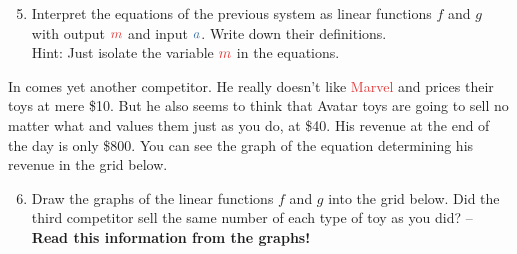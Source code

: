 \documentclass[a4paper,12pt]{article}
\newcommand{\tmar}{\textcolor[HTML]{e23636}}
\newcommand{\tav}{\textcolor[HTML]{2e67a0}}
\begin{document}
\newpage

\begin{enumerate}[label=(\alph*),topsep=0pt]
 \setcounter{enumi}{4}
 \item Interpret the equations of the previous system as linear functions $f$
  and $g$ with output $\tmar{m}$ and input $\tav{a}$. Write down their
  definitions.\\
  Hint: Just isolate the variable $\tmar{m}$ in the equations.
\end{enumerate}

\newpage

In comes yet another competitor. He really doesn't like \tmar{Marvel} and prices
their toys at mere \$10. But he also seems to think that \tav{Avatar} toys are
going to sell no matter what and values them just as you do, at \$40. His
revenue at the end of the day is only \$800. You can see the graph of the
equation determining his revenue in the grid below.

\begin{enumerate}[label=(\alph*),topsep=0pt]
 \setcounter{enumi}{5}
 \item Draw the graphs of the linear functions $f$ and $g$ into the grid below.
  Did the third competitor sell the same number of each type of toy as you
  did? -- \textbf{Read this information from the graphs!}
\end{enumerate}

\begin{center}
\end{center}
\end{document}

